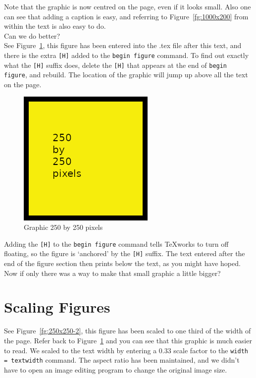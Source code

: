 Note that the graphic is now centred on the page, even if it looks small.  Also one can see that adding a caption is easy, and referring to Figure~\ref{fg:1000x200} from within the text is also easy to do.\\

Can we do better?\\

See Figure~\ref{fg:250x250}, this figure has been entered into the .tex file after this text, and there is the extra \texttt{[H]} added to the \texttt{begin figure} command. To find out exactly what the \texttt{[H]} suffix does, delete the \texttt{[H]} that appears at the end of \texttt{begin figure}, and rebuild.  The location of the graphic will jump up above all the text on the page.

\begin{figure}[H]
\centering
\includegraphics{250x250}
\caption{Graphic 250 by 250 pixels}\label{fg:250x250}
\end{figure}

Adding the \texttt{[H]} to the \texttt{begin figure} command tells TeXworks to turn off floating, so the figure is `anchored' by the \texttt{[H]} suffix.  The text entered after the end of the figure section then prints below the text, as you might have hoped.\\

Now if only there was a way to make that small graphic a little bigger?

\section{Scaling Figures}

See Figure~\ref{fg:250x250-2}, this figure has been scaled to one third of the width of the page.  Refer back to Figure~\ref{fg:250x250} and you can see that this graphic is much easier to read.  We scaled to the text width by entering a 0.33 scale factor to the \texttt{width =  textwidth} command. The aspect ratio has been maintained, and we didn't have to open an image editing program to change the original image size.\\

